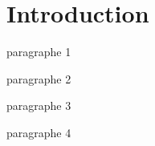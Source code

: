 \section{Introduction}

\par
paragraphe 1\\

\par
paragraphe 2 \\

\par
paragraphe 3 \\

\par 
paragraphe 4